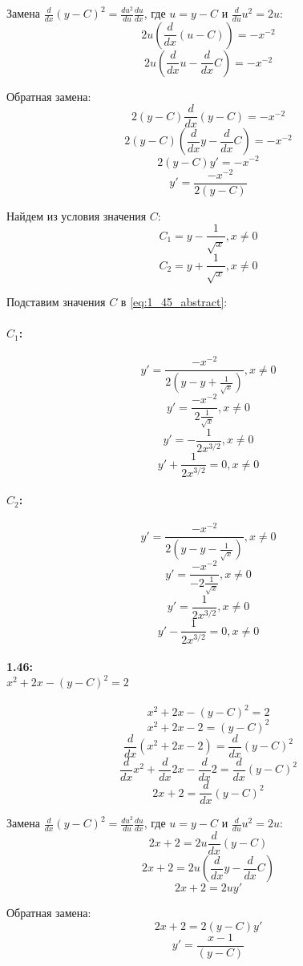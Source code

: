 Замена $\frac{d}{dx}(y - C)^2 = \frac{du^2}{du}\frac{du}{dx}$, где $u = y - C$ и $\frac{d}{du}u^2 = 2u$:
\[2u\left(\frac{d}{dx}(u - C)\right) = -x^{-2}\]
\[2u\left(\frac{d}{dx}u - \frac{d}{dx}C\right) = -x^{-2}\]

Обратная замена:
\[2(y - C)\frac{d}{dx}(y - C) = -x^{-2}\]
\[2(y - C)\left(\frac{d}{dx}y - \frac{d}{dx}C\right) = -x^{-2}\]
\[2(y - C)y' = -x^{-2}\]
\begin{equation}
  y' = \frac{-x^{-2}}{2(y - C)}
  \label{eq:1_45_abstract}
\end{equation}

Найдем из условия значения $C$:
\[C_1 = y - \frac{1}{\sqrt{x}}, x \neq 0\]
\[C_2 = y + \frac{1}{\sqrt{x}}, x \neq 0\]

Подставим значения $C$ в \ref{eq:1_45_abstract}:
\paragraph{$C_1$:}
\[y' = \frac{-x^{-2}}{2(y - y + \frac{1}{\sqrt{x}})}, x \neq 0\]
\[y' = \frac{-x^{-2}}{2\frac{1}{\sqrt{x}}}, x \neq 0\]
\[y' = -\frac{1}{2x^{3/2}}, x \neq 0\]
\[y' + \frac{1}{2x^{3/2}} = 0, x \neq 0\]

\paragraph{$C_2$:}
\[y' = \frac{-x^{-2}}{2(y - y - \frac{1}{\sqrt{x}})}, x \neq 0\]
\[y' = \frac{-x^{-2}}{-2\frac{1}{\sqrt{x}}}, x \neq 0\]
\[y' = \frac{1}{2x^{3/2}}, x \neq 0\]
\[y' - \frac{1}{2x^{3/2}} = 0, x \neq 0\]

\paragraph{1.46:\\ $x^2 + 2x - (y - C)^2 = 2$}
\[x^2 + 2x - (y - C)^2 = 2\]
\[x^2 + 2x - 2 = (y - C)^2\]
\[\frac{d}{dx}(x^2 + 2x - 2) = \frac{d}{dx}(y - C)^2\]
\[\frac{d}{dx}x^2 + \frac{d}{dx}2x - \frac{d}{dx}2 = \frac{d}{dx}(y - C)^2\]
\[2x + 2 = \frac{d}{dx}(y - C)^2\]

Замена $\frac{d}{dx}(y - C)^2 = \frac{du^2}{du}\frac{du}{dx}$, где $u = y - C$ и $\frac{d}{du}u^2 = 2u$:
\[2x + 2 = 2u\frac{d}{dx}(y - C)\]
\[2x + 2 = 2u\left(\frac{d}{dx}y - \frac{d}{dx}C\right)\]
\[2x + 2 = 2uy'\]

Обратная замена:
\[2x + 2 = 2(y - C)y'\]
\begin{equation}
  y' = \frac{x - 1}{(y - C)}
  \label{eq:1_46_abstract}
\end{equation}

